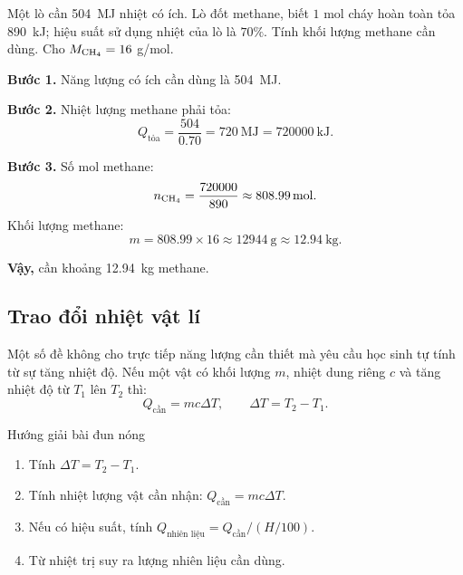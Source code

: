 \begin{vidu}
Một lò cần \SI{504}{\mega\joule} nhiệt có ích. Lò đốt methane, biết $1$ mol  cháy hoàn toàn tỏa \SI{890}{\kilo\joule}; hiệu suất sử dụng nhiệt của lò là $70\%$. Tính khối lượng methane cần dùng. Cho $M_{\ce{CH4}}=16$ g/mol.
\end{vidu}
\begin{loigiai}
\textbf{Bước 1.} Năng lượng có ích cần dùng là \SI{504}{\mega\joule}.

\textbf{Bước 2.} Nhiệt lượng methane phải tỏa:
\[
Q_{\text{tỏa}}=\frac{504}{0.70}=\SI{720}{\mega\joule}=\SI{720000}{\kilo\joule}.
\]

\textbf{Bước 3.} Số mol methane:
\[
n_{\ce{CH4}}=\frac{720000}{890}\approx\SI{808.99}{\mole}.
\]
Khối lượng methane:
\[
m=808.99\times16\approx\SI{12944}{\gram}\approx\SI{12.94}{\kilo\gram}.
\]

\textbf{Vậy,} cần khoảng \SI{12.94}{\kilo\gram} methane.
\end{loigiai}

\subsection{Trao đổi nhiệt vật lí}

Một số đề không cho trực tiếp năng lượng cần thiết mà yêu cầu học sinh tự tính từ sự tăng nhiệt độ. Nếu một vật có khối lượng $m$, nhiệt dung riêng $c$ và tăng nhiệt độ từ $T_1$ lên $T_2$ thì:
\[
Q_{\text{cần}}=mc\Delta T,
\qquad
\Delta T=T_2-T_1.
\]

\begin{ghinho}{Hướng giải bài đun nóng}
\begin{enumerate}
\item Tính $\Delta T=T_2-T_1$.
\item Tính nhiệt lượng vật cần nhận: $Q_{\text{cần}}=mc\Delta T$.
\item Nếu có hiệu suất, tính $Q_{\text{nhiên liệu}}=Q_{\text{cần}}/(H/100)$.
\item Từ nhiệt trị suy ra lượng nhiên liệu cần dùng.
\end{enumerate}
\end{ghinho}

